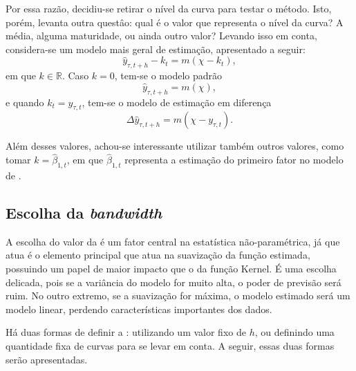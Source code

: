 \documentclass[
	12pt,				%
	openright,			%
	oneside,			%
	a4paper,			%
	english,			%
	brazil				%
	]{dissertacao-ufrgs-abntex2}
\begin{document}
Por essa razão, decidiu-se retirar o nível da curva para testar o método. Isto, porém, levanta outra questâo: qual é o valor que representa o nível da curva? A média, alguma maturidade, ou ainda outro valor? Levando isso em conta, considera-se um modelo mais geral de estimação, apresentado a seguir:
\begin{equation}
\hat{y}_{\tau,t+h} - k_t = m(\chi - k_t),
\end{equation}
em que $k \in \mathbb{R}$. Caso $k=0$, tem-se o modelo padrão
\begin{equation}
\hat{y}_{\tau,t+h}= m(\chi),
\end{equation}
e quando $k_t = y_{\tau,t}$, tem-se o modelo de estimação em diferença
\begin{equation}
\Delta \hat{y}_{\tau,t+h}= m(\chi - y_{\tau,t}).
\end{equation}

Além desses valores, achou-se interessante utilizar também outros valores, como tomar $k = \hat{\beta}_{1,t}$, em que $\hat{\beta}_{1,t}$ representa a estimação do primeiro fator no modelo de . 

\subsection*{Escolha da \emph{bandwidth}}

A escolha do valor da \bw é um fator central na estatística não-paramétrica, já que atua é o elemento principal que atua na suavização da função estimada, possuindo um papel de maior impacto que o da função Kernel. É uma escolha delicada, pois se a variância do modelo for muito alta, o poder de previsão será ruim. No outro extremo, se a suavização for máxima, o modelo estimado será um modelo linear, perdendo características importantes dos dados.


Há duas formas de definir a \bw: utilizando um valor fixo de $h$, ou definindo uma quantidade fixa de curvas para se levar em conta. A seguir, essas duas formas serão apresentadas.
\end{document}
